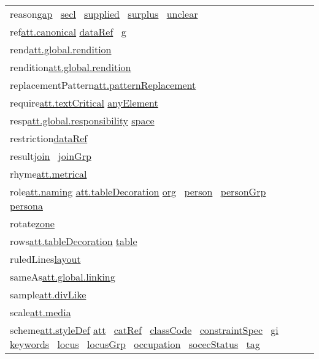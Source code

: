 \begin{longtable}{L{.2\textwidth}P{.8\textwidth}}
reason\tabcellsep \hyperref[TEI.gap]{gap}  \hyperref[TEI.secl]{secl}  \hyperref[TEI.supplied]{supplied}  \hyperref[TEI.surplus]{surplus}  \hyperref[TEI.unclear]{unclear} \\
ref\tabcellsep \hyperref[TEI.att.canonical]{att.canonical} \hyperref[TEI.dataRef]{dataRef}  \hyperref[TEI.g]{g} \\
rend\tabcellsep \hyperref[TEI.att.global.rendition]{att.global.rendition}\\
rendition\tabcellsep \hyperref[TEI.att.global.rendition]{att.global.rendition}\\
replacementPattern\tabcellsep \hyperref[TEI.att.patternReplacement]{att.patternReplacement}\\
require\tabcellsep \hyperref[TEI.att.textCritical]{att.textCritical} \hyperref[TEI.anyElement]{anyElement} \\
resp\tabcellsep \hyperref[TEI.att.global.responsibility]{att.global.responsibility} \hyperref[TEI.space]{space} \\
restriction\tabcellsep \hyperref[TEI.dataRef]{dataRef} \\
result\tabcellsep \hyperref[TEI.join]{join}  \hyperref[TEI.joinGrp]{joinGrp} \\
rhyme\tabcellsep \hyperref[TEI.att.metrical]{att.metrical}\\
role\tabcellsep \hyperref[TEI.att.naming]{att.naming} \hyperref[TEI.att.tableDecoration]{att.tableDecoration} \hyperref[TEI.org]{org}  \hyperref[TEI.person]{person}  \hyperref[TEI.personGrp]{personGrp}  \hyperref[TEI.persona]{persona} \\
rotate\tabcellsep \hyperref[TEI.zone]{zone} \\
rows\tabcellsep \hyperref[TEI.att.tableDecoration]{att.tableDecoration} \hyperref[TEI.table]{table} \\
ruledLines\tabcellsep \hyperref[TEI.layout]{layout} \\
sameAs\tabcellsep \hyperref[TEI.att.global.linking]{att.global.linking}\\
sample\tabcellsep \hyperref[TEI.att.divLike]{att.divLike}\\
scale\tabcellsep \hyperref[TEI.att.media]{att.media}\\
scheme\tabcellsep \hyperref[TEI.att.styleDef]{att.styleDef} \hyperref[TEI.att]{att}  \hyperref[TEI.catRef]{catRef}  \hyperref[TEI.classCode]{classCode}  \hyperref[TEI.constraintSpec]{constraintSpec}  \hyperref[TEI.gi]{gi}  \hyperref[TEI.keywords]{keywords}  \hyperref[TEI.locus]{locus}  \hyperref[TEI.locusGrp]{locusGrp}  \hyperref[TEI.occupation]{occupation}  \hyperref[TEI.socecStatus]{socecStatus}  \hyperref[TEI.tag]{tag} \\

\end{longtable}
